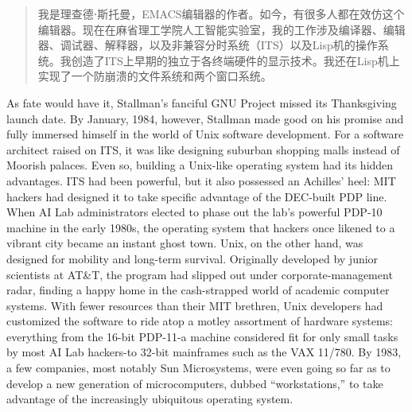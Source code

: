 \ifdefined\chs
\begin{quote}
我是理查德⋅斯托曼，EMACS编辑器的作者。如今，有很多人都在效仿这个编辑器。现在在麻省理工学院人工智能实验室，我的工作涉及编译器、编辑器、调试器、解释器，以及非兼容分时系统（ITS）以及Lisp机的操作系统。我创造了ITS上早期的独立于各终端硬件的显示技术。我还在Lisp机上实现了一个防崩溃的文件系统和两个窗口系统。
\end{quote}
\fi

\ifdefined\eng
\ifdefined\vone
As fate would have it, Stallman's fanciful GNU Project missed its Thanksgiving launch date. By January, 1984, however, Stallman made good on his promise and fully immersed himself in the world of Unix software development. For a software architect raised on ITS, it was like designing suburban shopping malls instead of Moorish palaces. Even so, building a Unix-like operating system had its hidden advantages. ITS had been powerful, but it also possessed an Achilles' heel: MIT hackers had designed it to take specific advantage of the DEC-built PDP line. When AI Lab administrators elected to phase out the lab's powerful PDP-10 machine in the early 1980s, the operating system that hackers once likened to a vibrant city became an instant ghost town. Unix, on the other hand, was designed for mobility and long-term survival. Originally developed by junior scientists at AT\&T, the program had slipped out under corporate-management radar, finding a happy home in the cash-strapped world of academic computer systems. With fewer resources than their MIT brethren, Unix developers had customized the software to ride atop a motley assortment of hardware systems: everything from the 16-bit PDP-11-a machine considered fit for only small tasks by most AI Lab hackers-to 32-bit mainframes such as the VAX 11/780. By 1983, a few companies, most notably Sun Microsystems, were even going so far as to develop a new generation of microcomputers, dubbed ``workstations,'' to take advantage of the increasingly ubiquitous operating system.
\fi
\ifdefined\vtwo

